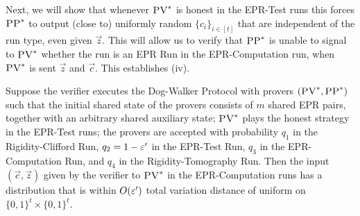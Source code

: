 Next, we will show that whenever $\textsc{PV}^*$ is honest in the EPR-Test runs this forces $\textsc{PP}^*$ to output (close to) uniformly random $\{c_i\}_{i\in [t]}$ that are independent of the run type, even given $\vec{z}$. This will allow us to verify that $\textsc{PP}^*$ is unable to signal to $\textsc{PV}^*$ whether the run is an EPR Run in the EPR-Computation run, when $\textsc{PV}^*$ is sent $\vec{z}$ and $\vec{c}$. This establishes (iv). 


\begin{lemma}\label{lem:ci-unif}
Suppose the verifier executes the Dog-Walker Protocol with provers $(\textsc{PV}^*,\textsc{PP}^*)$ such that the initial shared state of the provers consists of $m$ shared EPR pairs, together with an arbitrary shared auxiliary state; $\textsc{PV}^*$ plays the honest strategy in the EPR-Test runs; the provers are accepted with probability $q_1$ in the Rigidity-Clifford Run, $q_2 = 1-\varepsilon'$ in the EPR-Test Run, $q_3$ in the EPR-Computation Run, and $q_4$ in the Rigidity-Tomography Run. Then the input $(\vec{c},\vec{z})$ given by the verifier to $\textsc{PV}^*$ in the EPR-Computation runs has a distribution that is within $O(\varepsilon')$ total variation distance of uniform on $\{0,1\}^t\times\{0,1\}^t$. 
\end{lemma}


